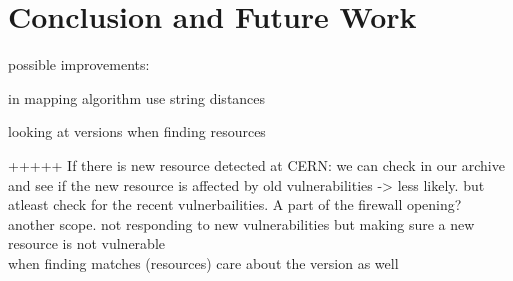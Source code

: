 \chapter{Conclusion and Future Work}
\label{chap7-conclusion-and-future-work}
\thispagestyle{empty}

possible improvements:

in mapping algorithm use string distances

looking at versions when finding resources


+++++
If there is new resource detected at CERN: we can check in our archive and see if the new resource is affected by old vulnerabilities -> less likely. but atleast check for the recent vulnerbailities. A part of the firewall opening? 
another scope. not responding to new vulnerabilities but making sure a new resource is not vulnerable
\\
when finding matches (resources) care about the version as well


